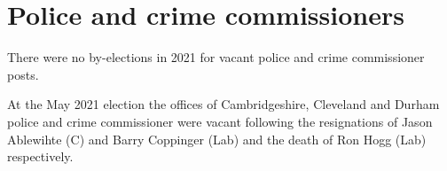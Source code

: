 \documentclass[a4paper,openany]{book}
\begin{document}
\section{Police and crime commissioners}

There were no by-elections in 2021 for vacant police and crime commissioner posts.

At the May 2021 election the offices of Cambridgeshire, Cleveland and Durham police and crime commissioner were vacant following the resignations of Jason Ablewihte (C) and Barry Coppinger (Lab) and the death of Ron Hogg (Lab) respectively.

%
%
%
%
%

%
\end{document}
